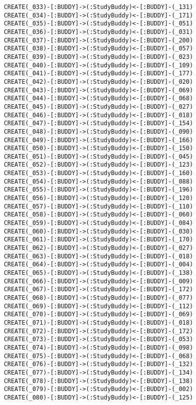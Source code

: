 \begin{lstlisting}
	CREATE(_033)-[:BUDDY]->(:StudyBuddy)<-[:BUDDY]-(_131)
	CREATE(_034)-[:BUDDY]->(:StudyBuddy)<-[:BUDDY]-(_171)
	CREATE(_035)-[:BUDDY]->(:StudyBuddy)<-[:BUDDY]-(_051)
	CREATE(_036)-[:BUDDY]->(:StudyBuddy)<-[:BUDDY]-(_031)
	CREATE(_037)-[:BUDDY]->(:StudyBuddy)<-[:BUDDY]-(_200)
	CREATE(_038)-[:BUDDY]->(:StudyBuddy)<-[:BUDDY]-(_057)
	CREATE(_039)-[:BUDDY]->(:StudyBuddy)<-[:BUDDY]-(_023)
	CREATE(_040)-[:BUDDY]->(:StudyBuddy)<-[:BUDDY]-(_109)
	CREATE(_041)-[:BUDDY]->(:StudyBuddy)<-[:BUDDY]-(_177)
	CREATE(_042)-[:BUDDY]->(:StudyBuddy)<-[:BUDDY]-(_020)
	CREATE(_043)-[:BUDDY]->(:StudyBuddy)<-[:BUDDY]-(_069)
	CREATE(_044)-[:BUDDY]->(:StudyBuddy)<-[:BUDDY]-(_068)
	CREATE(_045)-[:BUDDY]->(:StudyBuddy)<-[:BUDDY]-(_027)
	CREATE(_046)-[:BUDDY]->(:StudyBuddy)<-[:BUDDY]-(_018)
	CREATE(_047)-[:BUDDY]->(:StudyBuddy)<-[:BUDDY]-(_154)
	CREATE(_048)-[:BUDDY]->(:StudyBuddy)<-[:BUDDY]-(_090)
	CREATE(_049)-[:BUDDY]->(:StudyBuddy)<-[:BUDDY]-(_166)
	CREATE(_050)-[:BUDDY]->(:StudyBuddy)<-[:BUDDY]-(_150)
	CREATE(_051)-[:BUDDY]->(:StudyBuddy)<-[:BUDDY]-(_045)
	CREATE(_052)-[:BUDDY]->(:StudyBuddy)<-[:BUDDY]-(_123)
	CREATE(_053)-[:BUDDY]->(:StudyBuddy)<-[:BUDDY]-(_160)
	CREATE(_054)-[:BUDDY]->(:StudyBuddy)<-[:BUDDY]-(_088)
	CREATE(_055)-[:BUDDY]->(:StudyBuddy)<-[:BUDDY]-(_196)
	CREATE(_056)-[:BUDDY]->(:StudyBuddy)<-[:BUDDY]-(_120)
	CREATE(_057)-[:BUDDY]->(:StudyBuddy)<-[:BUDDY]-(_110)
	CREATE(_058)-[:BUDDY]->(:StudyBuddy)<-[:BUDDY]-(_060)
	CREATE(_059)-[:BUDDY]->(:StudyBuddy)<-[:BUDDY]-(_084)
	CREATE(_060)-[:BUDDY]->(:StudyBuddy)<-[:BUDDY]-(_030)
	CREATE(_061)-[:BUDDY]->(:StudyBuddy)<-[:BUDDY]-(_170)
	CREATE(_062)-[:BUDDY]->(:StudyBuddy)<-[:BUDDY]-(_027)
	CREATE(_063)-[:BUDDY]->(:StudyBuddy)<-[:BUDDY]-(_018)
	CREATE(_064)-[:BUDDY]->(:StudyBuddy)<-[:BUDDY]-(_004)
	CREATE(_065)-[:BUDDY]->(:StudyBuddy)<-[:BUDDY]-(_138)
	CREATE(_066)-[:BUDDY]->(:StudyBuddy)<-[:BUDDY]-(_009)
	CREATE(_067)-[:BUDDY]->(:StudyBuddy)<-[:BUDDY]-(_172)
	CREATE(_068)-[:BUDDY]->(:StudyBuddy)<-[:BUDDY]-(_077)
	CREATE(_069)-[:BUDDY]->(:StudyBuddy)<-[:BUDDY]-(_112)
	CREATE(_070)-[:BUDDY]->(:StudyBuddy)<-[:BUDDY]-(_069)
	CREATE(_071)-[:BUDDY]->(:StudyBuddy)<-[:BUDDY]-(_018)
	CREATE(_072)-[:BUDDY]->(:StudyBuddy)<-[:BUDDY]-(_172)
	CREATE(_073)-[:BUDDY]->(:StudyBuddy)<-[:BUDDY]-(_053)
	CREATE(_074)-[:BUDDY]->(:StudyBuddy)<-[:BUDDY]-(_098)
	CREATE(_075)-[:BUDDY]->(:StudyBuddy)<-[:BUDDY]-(_068)
	CREATE(_076)-[:BUDDY]->(:StudyBuddy)<-[:BUDDY]-(_132)
	CREATE(_077)-[:BUDDY]->(:StudyBuddy)<-[:BUDDY]-(_134)
	CREATE(_078)-[:BUDDY]->(:StudyBuddy)<-[:BUDDY]-(_138)
	CREATE(_079)-[:BUDDY]->(:StudyBuddy)<-[:BUDDY]-(_002)
	CREATE(_080)-[:BUDDY]->(:StudyBuddy)<-[:BUDDY]-(_125)

\end{lstlisting}
